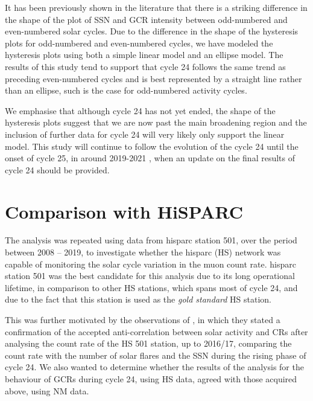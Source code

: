 It has been previously shown in the literature that there is a striking difference in the shape of the plot of SSN and GCR intensity between odd-numbered and even-numbered solar cycles. Due to the difference in the shape of the hysteresis plots for odd-numbered and even-numbered cycles, we have modeled the hysteresis plots using both a simple linear model and an ellipse model. The results of this study tend to support that cycle 24 follows the same trend as preceding even-numbered cycles and is best represented by a straight line rather than an ellipse, such is the case for odd-numbered activity cycles.

We emphasise that although cycle 24 has not yet ended, the shape of the hysteresis plots suggest that we are now past the main broadening region and the inclusion of further data for cycle 24 will very likely only support the linear model. This study will continue to follow the evolution of the cycle 24 until the onset of cycle 25, in around 2019-2021 \citep{howe_signatures_2018, upton_updated_2018, pesnell_early_2018}, when an update on the final results of cycle 24 should be provided.







\section{Comparison with HiSPARC}\label{sec:HS_vs_SSN}

The analysis was repeated using data from \gls{hisparc} station 501, over the period between 2008 -- 2019, to investigate whether the \gls{hisparc} (HS) network was capable of monitoring the solar cycle variation in the muon count rate. \gls{hisparc} station 501 was the best candidate for this analysis due to its long operational lifetime, in comparison to other HS stations, which spans most of cycle 24, and due to the fact that this station is used as the {\it gold standard} HS station. 

This was further motivated by the observations of \citet{fan_analysis_2018}, in which they stated a confirmation of the accepted anti-correlation between solar activity and CRs after analysing the count rate of the HS 501 station, up to 2016/17, comparing the count rate with the number of solar flares and the SSN during the rising phase of cycle 24. We also wanted to determine whether the results of the analysis for the behaviour of GCRs during cycle 24, using HS data, agreed with those acquired above, using NM data.

